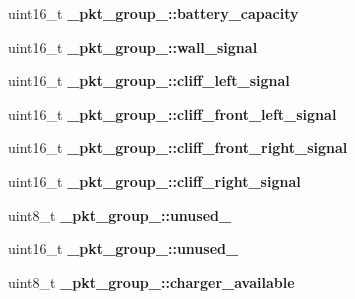 \begin{DoxyCompactItemize}
\item 
\hypertarget{group__roomba-lib_gaee2a991fe43f16ec3b20b56b326a1223}{}uint16\+\_\+t {\bfseries \+\_\+pkt\+\_\+group\+\_\+::battery\+\_\+capacity}\label{group__roomba-lib_gaee2a991fe43f16ec3b20b56b326a1223}

\item 
\hypertarget{group__roomba-lib_ga6d2b5159f2f5706153a61e07db31ec89}{}uint16\+\_\+t {\bfseries \+\_\+pkt\+\_\+group\+\_\+::wall\+\_\+signal}\label{group__roomba-lib_ga6d2b5159f2f5706153a61e07db31ec89}

\item 
\hypertarget{group__roomba-lib_ga2301a2828ba6778fdb50df01b8255dd4}{}uint16\+\_\+t {\bfseries \+\_\+pkt\+\_\+group\+\_\+::cliff\+\_\+left\+\_\+signal}\label{group__roomba-lib_ga2301a2828ba6778fdb50df01b8255dd4}

\item 
\hypertarget{group__roomba-lib_ga72cfc12609ec044adf81216e27b3e30f}{}uint16\+\_\+t {\bfseries \+\_\+pkt\+\_\+group\+\_\+::cliff\+\_\+front\+\_\+left\+\_\+signal}\label{group__roomba-lib_ga72cfc12609ec044adf81216e27b3e30f}

\item 
\hypertarget{group__roomba-lib_gac9f195bd7ec42005365c954bc1edadce}{}uint16\+\_\+t {\bfseries \+\_\+pkt\+\_\+group\+\_\+::cliff\+\_\+front\+\_\+right\+\_\+signal}\label{group__roomba-lib_gac9f195bd7ec42005365c954bc1edadce}

\item 
\hypertarget{group__roomba-lib_ga7558f1957ba15fcbdf357db28534f299}{}uint16\+\_\+t {\bfseries \+\_\+pkt\+\_\+group\+\_\+::cliff\+\_\+right\+\_\+signal}\label{group__roomba-lib_ga7558f1957ba15fcbdf357db28534f299}

\item 
\hypertarget{group__roomba-lib_ga9a294e4b534f6c8e32c574eb51803d1d}{}uint8\+\_\+t {\bfseries \+\_\+pkt\+\_\+group\+\_\+::unused\+\_}\label{group__roomba-lib_ga9a294e4b534f6c8e32c574eb51803d1d}

\item 
\hypertarget{group__roomba-lib_ga12176b875d2c8520ca9543a715e948a1}{}uint16\+\_\+t {\bfseries \+\_\+pkt\+\_\+group\+\_\+::unused\+\_}\label{group__roomba-lib_ga12176b875d2c8520ca9543a715e948a1}

\item 
\hypertarget{group__roomba-lib_gaee7319bdb7d6605393e112f846a1a0e4}{}uint8\+\_\+t {\bfseries \+\_\+pkt\+\_\+group\+\_\+::charger\+\_\+available}\label{group__roomba-lib_gaee7319bdb7d6605393e112f846a1a0e4}


\end{DoxyCompactItemize}
